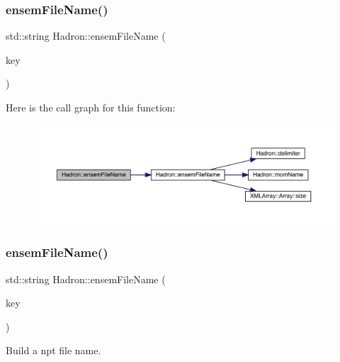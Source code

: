 \subsubsection{\texorpdfstring{ensemFileName()}{ensemFileName()}\hspace{0.1cm}{\footnotesize\ttfamily [7/12]}}
{\footnotesize\ttfamily std\+::string Hadron\+::ensem\+File\+Name (\begin{DoxyParamCaption}\item[{const \mbox{\hyperlink{structHadron_1_1KeyHadronNPartNPtCorr__t_1_1NPoint__t}{Hadron\+::\+Key\+Hadron\+N\+Part\+N\+Pt\+Corr\+\_\+t\+::\+N\+Point\+\_\+t}} \&}]{key }\end{DoxyParamCaption})}

Here is the call graph for this function\+:
\nopagebreak
\begin{figure}[H]
\begin{center}
\leavevmode
\includegraphics[width=350pt]{d1/daf/namespaceHadron_ac1f8513c22ed958fc79537d0cfc00e1f_cgraph}
\end{center}
\end{figure}
\mbox{\label{namespaceHadron_a8e1d2864f30c4b930840948366f8f356}} 
\subsubsection{\texorpdfstring{ensemFileName()}{ensemFileName()}\hspace{0.1cm}{\footnotesize\ttfamily [8/12]}}
{\footnotesize\ttfamily std\+::string Hadron\+::ensem\+File\+Name (\begin{DoxyParamCaption}\item[{const \mbox{\hyperlink{structHadron_1_1KeyHadronNPartNPtCorr__t}{Hadron\+::\+Key\+Hadron\+N\+Part\+N\+Pt\+Corr\+\_\+t}} \&}]{key }\end{DoxyParamCaption})}



Build a npt file name. 

